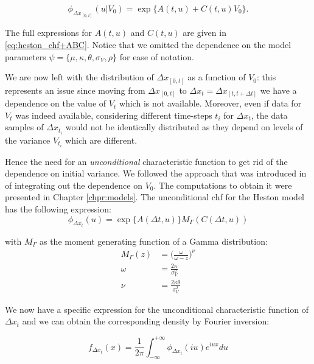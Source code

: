 \begin{equation}
\phi_{\Delta x_{[0, t] }}(u|V_0) =  \exp\{A(t,u) + C(t,u) V_0\}.
\end{equation}

The full expressions for $A(t,u)$ and $C(t,u)$ are given in \eqref{eq:heston_chf+ABC}.
Notice that we omitted the dependence on the model parameters $\psi = \{\mu, \kappa, \theta, \sigma_V, \rho \}$ for ease of notation.

\bigskip
We are now left with the distribution of $\Delta x_{[0, t] }$ as a function of $V_0$: this represents an issue since moving from $\Delta x_{[0, t] }$ to $\Delta x_t  = \Delta x_{[t, t + \Delta t]}$ we have a dependence on the value of $V_t$ which is not available. Moreover, even if data for $V_t$ was indeed available, considering different time-steps $t_i$ for $\Delta x_{t}$, the data samples of $\Delta x_{t_i}$ would not be identically distributed as they depend on levels of the variance $V_{t_i}$ which are different.

Hence the need for an \textit{unconditional} characteristic function to get rid of the dependence on initial variance. We followed the approach that was introduced in \cite{DRAGULESCU2002} of integrating out the dependence on $V_0$. The computations to obtain it were presented in Chapter \ref{chpr:models}.
The unconditional chf for the Heston model has the following expression:
\begin{equation}
 \phi_{\Delta x_t}(u) = \exp\{A(\Delta t,u) \} M_{\Gamma}(C(\Delta t,u))
\end{equation}


with $M_{\Gamma}$ as the moment generating function of a Gamma distribution:
\begin{subequations}
\begin{align}
	M_{\Gamma} (z) &= \Big(\frac{\omega}{\omega-z}\Big)^\nu \nonumber \\
	\omega&= \frac{2\kappa}{\sigma_V^2} \nonumber\\
	\nu&= \frac{2\kappa\theta}{\sigma_V^2}\nonumber
\end{align}
\end{subequations}

We now have a specific expression for the unconditional characteristic function of $\Delta x_t$ and we can obtain the corresponding density by Fourier inversion:

\begin{equation}
\label{eq:uncond_inversion}
f_{\Delta x_t}(x) = \frac{1}{2\pi}\int_{-\infty}^{+\infty}  \phi_{\Delta x_t}(i u) e^{i u x} du
\end{equation}



